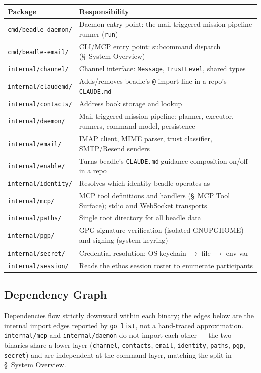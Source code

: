 \documentclass[a4paper,10pt,fleqn]{article}
\begin{document}
\begin{center}
\begin{tabular}{@{}lp{10.5cm}@{}}
\toprule
\textbf{Package} & \textbf{Responsibility} \\
\midrule
\texttt{cmd/beadle-daemon/}  & Daemon entry point: the mail-triggered mission pipeline runner (\texttt{run}) \\
\texttt{cmd/beadle-email/}   & CLI/MCP entry point: subcommand dispatch (\S~System Overview) \\
\texttt{internal/channel/}   & Channel interface: \texttt{Message}, \texttt{TrustLevel}, shared types \\
\texttt{internal/claudemd/}  & Adds/removes beadle's \texttt{@}-import line in a repo's \texttt{CLAUDE.md} \\
\texttt{internal/contacts/}  & Address book storage and lookup \\
\texttt{internal/daemon/}    & Mail-triggered mission pipeline: planner, executor, runners, command model, persistence \\
\texttt{internal/email/}     & IMAP client, MIME parser, trust classifier, SMTP/Resend senders \\
\texttt{internal/enable/}    & Turns beadle's \texttt{CLAUDE.md} guidance composition on/off in a repo \\
\texttt{internal/identity/}  & Resolves which identity beadle operates as \\
\texttt{internal/mcp/}       & MCP tool definitions and handlers (\S~MCP Tool Surface); stdio and WebSocket transports \\
\texttt{internal/paths/}     & Single root directory for all beadle data \\
\texttt{internal/pgp/}       & GPG signature verification (isolated GNUPGHOME) and signing (system keyring) \\
\texttt{internal/secret/}    & Credential resolution: OS keychain $\to$ file $\to$ env var \\
\texttt{internal/session/}   & Reads the ethos session roster to enumerate participants \\
\bottomrule
\end{tabular}
\end{center}

\subsection{Dependency Graph}

Dependencies flow strictly downward within each binary; the edges
below are the internal import edges reported by \texttt{go list}, not
a hand-traced approximation.  \texttt{internal/mcp} and
\texttt{internal/daemon} do not import each other --- the two binaries
share a lower layer (\texttt{channel}, \texttt{contacts},
\texttt{email}, \texttt{identity}, \texttt{paths}, \texttt{pgp},
\texttt{secret}) and are independent at the command layer, matching
the split in \S~System Overview.
\end{document}
